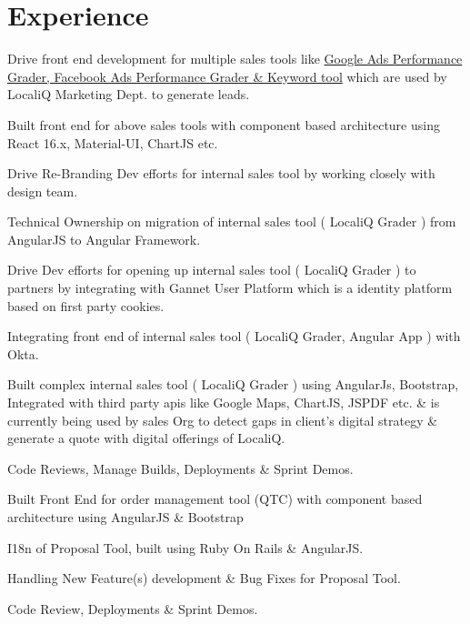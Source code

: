 \documentclass[]{my-resume-openfont}
\begin{document}
\hfill
\begin{minipage}[t]{0.66\textwidth}


\section{Experience}

\vspace{\topsep} %
\begin{tightemize}
\item{Drive front end development for multiple sales tools like \href{https://www.wordstream.com/wordstream-graders}{Google Ads Performance Grader, Facebook Ads Performance Grader \& Keyword tool} which are used by LocaliQ Marketing Dept. to generate leads.}
\item{Built front end for above sales tools with component based architecture using React 16.x, Material-UI, ChartJS etc.}
\item{Drive Re-Branding Dev efforts for internal sales tool by working closely with design team.}
\item{Technical Ownership on migration of internal sales tool ( LocaliQ Grader ) from AngularJS to Angular Framework.}
\item{Drive Dev efforts for opening up internal sales tool ( LocaliQ Grader ) to partners by integrating with Gannet User Platform which is a identity platform based on first party cookies.}
\item{Integrating front end of internal sales tool ( LocaliQ Grader, Angular App ) with Okta.}
\item{Built complex internal sales tool ( LocaliQ Grader ) using AngularJs, Bootstrap, Integrated with third party apis like Google Maps, ChartJS, JSPDF etc. \& is currently being used by sales Org to detect gaps in client's digital strategy \& generate a quote with digital offerings of LocaliQ.}
\item{Code Reviews, Manage Builds, Deployments \& Sprint Demos.}
\end{tightemize}
\sectionsep

\begin{tightemize}
\item{Built Front End for order management tool (QTC) with component based architecture using AngularJS \& Bootstrap}
\item{I18n of Proposal Tool, built using Ruby On Rails \& AngularJS.}
\item{Handling New Feature(s) development \& Bug Fixes for Proposal Tool.}
\item{Code Review, Deployments \& Sprint Demos.}
\end{tightemize}
\sectionsep


\end{minipage}
\end{document}
